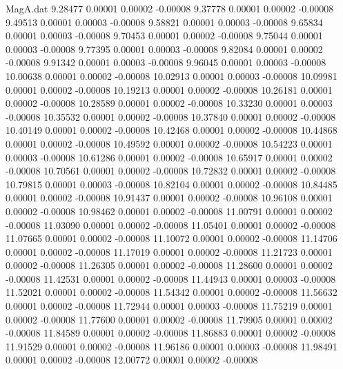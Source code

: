 \begin{filecontents}{MagA.dat}
   9.28477    0.00001    0.00002   -0.00008
   9.37778    0.00001    0.00002   -0.00008
   9.49513    0.00001    0.00003   -0.00008
   9.58821    0.00001    0.00003   -0.00008
   9.65834    0.00001    0.00003   -0.00008
   9.70453    0.00001    0.00002   -0.00008
   9.75044    0.00001    0.00003   -0.00008
   9.77395    0.00001    0.00003   -0.00008
   9.82084    0.00001    0.00002   -0.00008
   9.91342    0.00001    0.00003   -0.00008
   9.96045    0.00001    0.00003   -0.00008
  10.00638    0.00001    0.00002   -0.00008
  10.02913    0.00001    0.00003   -0.00008
  10.09981    0.00001    0.00002   -0.00008
  10.19213    0.00001    0.00002   -0.00008
  10.26181    0.00001    0.00002   -0.00008
  10.28589    0.00001    0.00002   -0.00008
  10.33230    0.00001    0.00003   -0.00008
  10.35532    0.00001    0.00002   -0.00008
  10.37840    0.00001    0.00002   -0.00008
  10.40149    0.00001    0.00002   -0.00008
  10.42468    0.00001    0.00002   -0.00008
  10.44868    0.00001    0.00002   -0.00008
  10.49592    0.00001    0.00002   -0.00008
  10.54223    0.00001    0.00003   -0.00008
  10.61286    0.00001    0.00002   -0.00008
  10.65917    0.00001    0.00002   -0.00008
  10.70561    0.00001    0.00002   -0.00008
  10.72832    0.00001    0.00002   -0.00008
  10.79815    0.00001    0.00003   -0.00008
  10.82104    0.00001    0.00002   -0.00008
  10.84485    0.00001    0.00002   -0.00008
  10.91437    0.00001    0.00002   -0.00008
  10.96108    0.00001    0.00002   -0.00008
  10.98462    0.00001    0.00002   -0.00008
  11.00791    0.00001    0.00002   -0.00008
  11.03090    0.00001    0.00002   -0.00008
  11.05401    0.00001    0.00002   -0.00008
  11.07665    0.00001    0.00002   -0.00008
  11.10072    0.00001    0.00002   -0.00008
  11.14706    0.00001    0.00002   -0.00008
  11.17019    0.00001    0.00002   -0.00008
  11.21723    0.00001    0.00002   -0.00008
  11.26305    0.00001    0.00002   -0.00008
  11.28600    0.00001    0.00002   -0.00008
  11.42531    0.00001    0.00002   -0.00008
  11.44943    0.00001    0.00003   -0.00008
  11.52021    0.00001    0.00002   -0.00008
  11.54342    0.00001    0.00002   -0.00008
  11.56632    0.00001    0.00002   -0.00008
  11.72944    0.00001    0.00003   -0.00008
  11.75219    0.00001    0.00002   -0.00008
  11.77600    0.00001    0.00002   -0.00008
  11.79905    0.00001    0.00002   -0.00008
  11.84589    0.00001    0.00002   -0.00008
  11.86883    0.00001    0.00002   -0.00008
  11.91529    0.00001    0.00002   -0.00008
  11.96186    0.00001    0.00003   -0.00008
  11.98491    0.00001    0.00002   -0.00008
  12.00772    0.00001    0.00002   -0.00008

\end{filecontents}
